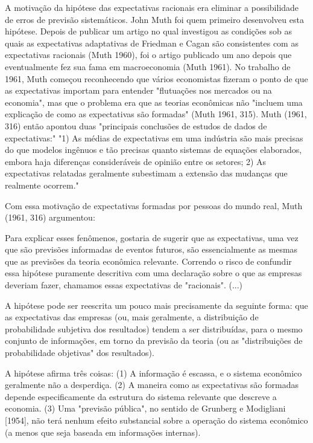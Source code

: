 \documentclass[12pt]{article}
\begin{document}
A motivação da hipótese das expectativas racionais era eliminar a possibilidade de erros de previsão sistemáticos. John Muth foi quem primeiro desenvolveu esta hipótese. Depois de publicar um artigo no qual investigou as condições sob as quais as expectativas adaptativas de Friedman e Cagan são consistentes com as expectativas racionais (Muth 1960), foi o artigo publicado um ano depois que eventualmente fez sua fama em macroeconomia (Muth 1961). No trabalho de 1961, Muth começou reconhecendo que vários economistas fizeram o ponto de que as expectativas importam para entender "flutuações nos mercados ou na economia", mas que o problema era que as teorias econômicas não "incluem uma explicação de como as expectativas são formadas" (Muth 1961, 315). Muth (1961, 316) então apontou duas "principais conclusões de estudos de dados de expectativas:" "1) As médias de expectativas em uma indústria são mais precisas do que modelos ingênuos e tão precisas quanto sistemas de equações elaborados, embora haja diferenças consideráveis de opinião entre os setores; 2) As expectativas relatadas geralmente subestimam a extensão das mudanças que realmente ocorrem."

Com essa motivação de expectativas formadas por pessoas do mundo real, Muth (1961, 316) argumentou:

Para explicar esses fenômenos, gostaria de sugerir que as expectativas, uma vez que são previsões informadas de eventos futuros, são essencialmente as mesmas que as previsões da teoria econômica relevante. Correndo o risco de confundir essa hipótese puramente descritiva com uma declaração sobre o que as empresas deveriam fazer, chamamos essas expectativas de "racionais". (...)

A hipótese pode ser reescrita um pouco mais precisamente da seguinte forma: que as expectativas das empresas (ou, mais geralmente, a distribuição de probabilidade subjetiva dos resultados) tendem a ser distribuídas, para o mesmo conjunto de informações, em torno da previsão da teoria (ou as "distribuições de probabilidade objetivas" dos resultados).

A hipótese afirma três coisas: (1) A informação é escassa, e o sistema econômico geralmente não a desperdiça. (2) A maneira como as expectativas são formadas depende especificamente da estrutura do sistema relevante que descreve a economia. (3) Uma "previsão pública", no sentido de Grunberg e Modigliani [1954], não terá nenhum efeito substancial sobre a operação do sistema econômico (a menos que seja baseada em informações internas).
\end{document}
